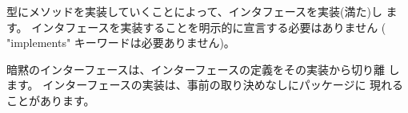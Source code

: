型にメソッドを実装していくことによって、インタフェースを実装(満た)し
ます。 インタフェースを実装することを明示的に宣言する必要はありません
( "implements" キーワードは必要ありません)。

暗黙のインターフェースは、インターフェースの定義をその実装から切り離
します。 インターフェースの実装は、事前の取り決めなしにパッケージに
現れることがあります。